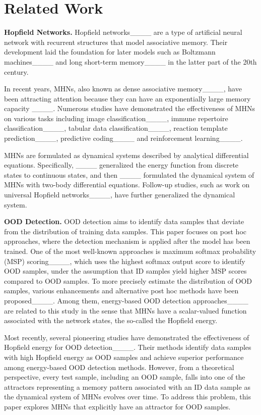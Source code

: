 \section{Related Work}
\noindent
\textbf{Hopfield Networks.}
Hopfield networks____ are a type of artificial neural network with recurrent structures that model associative memory.
Their development laid the foundation for later models such as Boltzmann machines____ and long short-term memory____ in the latter part of the 20th century.

In recent years, MHNs, also known as dense associative memory____, have been attracting attention because they can have an exponentially large memory capacity ____.
Numerous studies have demonstrated the effectiveness of MHNs on various tasks including image classification____, immune repertoire classification____,
tabular data classification____,
reaction template prediction____,
predictive coding____ and reinforcement learning____.

MHNs are formulated as dynamical systems described by analytical differential equations.
Specifically, ____ generalized the energy function from discrete states to continuous states, and then ____ formulated the dynamical system of MHNs with two-body differential equations.
Follow-up studies, such as work on universal Hopfield networks____, have further generalized the dynamical system.

\noindent \textbf{OOD Detection.}
OOD detection aims to identify data samples that deviate from the distribution of training data samples.
This paper focuses on post hoc approaches, where the detection mechanism is applied after the model has been trained.
One of the most well-known approaches is maximum softmax probability (MSP) scoring____, which uses the highest softmax output score to identify OOD samples, under the assumption that ID samples yield higher MSP scores compared to OOD samples.
To more precisely estimate the distribution of OOD samples, various enhancements and alternative post hoc methods have been proposed____.
Among them, energy-based OOD detection approaches____ are related to this study in the sense that MHNs have a scalar-valued function associated with the network states, the so-called the Hopfield energy.

Most recently, several pioneering studies have demonstrated the effectiveness of Hopfield energy for OOD detection____.
Their methods identify data samples with high Hopfield energy as OOD samples and achieve superior performance among energy-based OOD detection methods.
However, from a theoretical perspective, every test sample, including an OOD sample, falls into one of the attractors representing a memory pattern associated with an ID data sample as the dynamical system of MHNs evolves over time.
To address this problem, this paper explores MHNs that explicitly have an attractor for OOD samples.